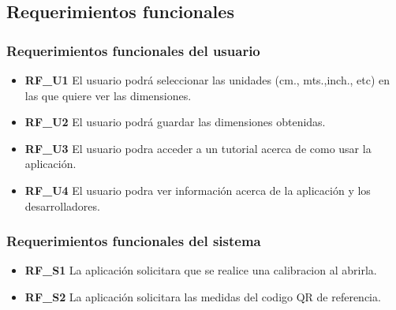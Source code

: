 \subsection{Requerimientos funcionales}
\subsubsection{Requerimientos funcionales del usuario}

\begin{itemize}
\item \textbf{RF\_U1} El usuario podrá seleccionar las unidades (cm., mts.,inch., etc) en las que quiere ver las dimensiones.
\item \textbf{RF\_U2} El usuario podrá guardar las dimensiones obtenidas.
\item \textbf{RF\_U3} El usuario podra acceder a un tutorial acerca de como usar la aplicación.
\item \textbf{RF\_U4} El usuario podra ver información acerca de la aplicación y los desarrolladores.
\end{itemize}

\subsubsection{Requerimientos funcionales del sistema}
\begin{itemize}
\item \textbf{RF\_S1} La aplicación solicitara que se realice una calibracion al abrirla.
\item \textbf{RF\_S2} La aplicación solicitara las medidas del codigo QR de referencia.

\end{itemize}